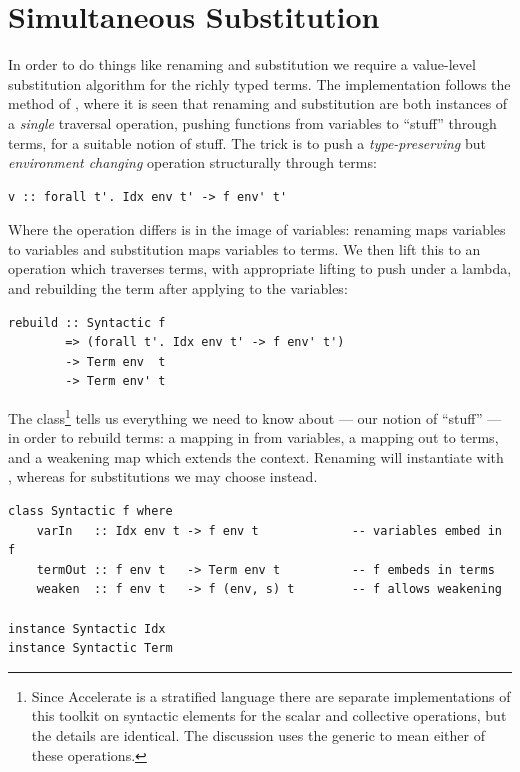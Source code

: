 \section{Simultaneous Substitution}
\label{sec:substitution}

In order to do things like renaming and substitution we require a value-level
substitution algorithm for the richly typed terms. The implementation follows
the method of \citet{McBride:2006up,McBride:2005jv}, where it is seen that
renaming and substitution are both instances of a \emph{single} traversal
operation, pushing functions from variables to ``stuff'' through terms, for a
suitable notion of stuff.
%
The trick is to push a \emph{type-preserving} but \emph{environment changing}
operation structurally through terms:
%
\begin{lstlisting}[style=haskell]
v :: forall t'. Idx env t' -> f env' t'
\end{lstlisting}

Where the operation differs is in the image of variables: renaming maps
variables to variables and substitution maps variables to terms. We then lift
this to an operation which traverses terms, with appropriate lifting to push
under a lambda, and rebuilding the term after applying  to the
variables:
%
\begin{lstlisting}[style=haskell]
rebuild :: Syntactic f
        => (forall t'. Idx env t' -> f env' t')
        -> Term env  t
        -> Term env' t
\end{lstlisting}

The  class\footnote{Since Accelerate is a stratified language
there are separate implementations of this toolkit on syntactic elements for the
scalar and collective operations, but the details are identical. The discussion
uses the generic  to mean either of these operations.} tells us
everything we need to know about  --- our notion of ``stuff'' --- in
order to rebuild terms: a mapping in from variables, a mapping out to terms, and
a weakening map which extends the context. Renaming will instantiate 
with , whereas for substitutions we may choose  instead.
%
\begin{lstlisting}[style=haskell]
class Syntactic f where
    varIn   :: Idx env t -> f env t             -- variables embed in f
    termOut :: f env t   -> Term env t          -- f embeds in terms
    weaken  :: f env t   -> f (env, s) t        -- f allows weakening

instance Syntactic Idx
instance Syntactic Term
\end{lstlisting}

